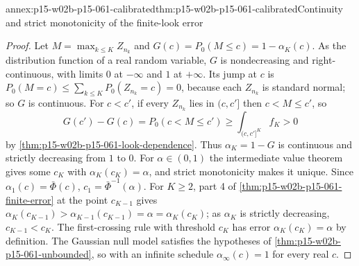 \begin{annexitem}{annex:p15-w02b-p15-061-calibrated}{thm:p15-w02b-p15-061-calibrated}{Continuity and strict monotonicity of the finite-look error}
\begin{proof}
Let \(M=\max_{k\leq K}Z_{n_k}\) and \(G(c)=P_0(M\leq c)=1-\alpha_K(c)\).
As the distribution function of a real random variable, \(G\) is
nondecreasing and right-continuous, with limits \(0\) at \(-\infty\) and
\(1\) at \(+\infty\). Its jump at \(c\) is
\(P_0(M=c)\leq\sum_{k\leq K}P_0(Z_{n_k}=c)=0\), because each
\(Z_{n_k}\) is standard normal; so \(G\) is continuous. For \(c<c'\),
if every \(Z_{n_k}\) lies in \((c,c']\) then \(c<M\leq c'\), so
\[
 G(c')-G(c)=P_0(c<M\leq c')\geq\int_{(c,c']^K}f_K>0
\]
by \cref{thm:p15-w02b-p15-061-look-dependence}. Thus \(\alpha_K=1-G\) is
continuous and strictly decreasing from \(1\) to \(0\). For
\(\alpha\in(0,1)\) the intermediate value theorem gives some \(c_K\) with
\(\alpha_K(c_K)=\alpha\), and strict monotonicity makes it unique. Since
\(\alpha_1(c)=\bar\Phi(c)\), \(c_1=\bar\Phi^{-1}(\alpha)\). For
\(K\geq2\), part 4 of \cref{thm:p15-w02b-p15-061-finite-error} at the
point \(c_{K-1}\) gives
\(\alpha_K(c_{K-1})>\alpha_{K-1}(c_{K-1})=\alpha=\alpha_K(c_K)\); as
\(\alpha_K\) is strictly decreasing, \(c_{K-1}<c_K\). The first-crossing
rule with threshold \(c_K\) has error \(\alpha_K(c_K)=\alpha\) by
definition. The Gaussian null model satisfies the hypotheses of
\cref{thm:p15-w02b-p15-061-unbounded}, so with an infinite schedule
\(\alpha_\infty(c)=1\) for every real \(c\).
\end{proof}
\end{annexitem}
